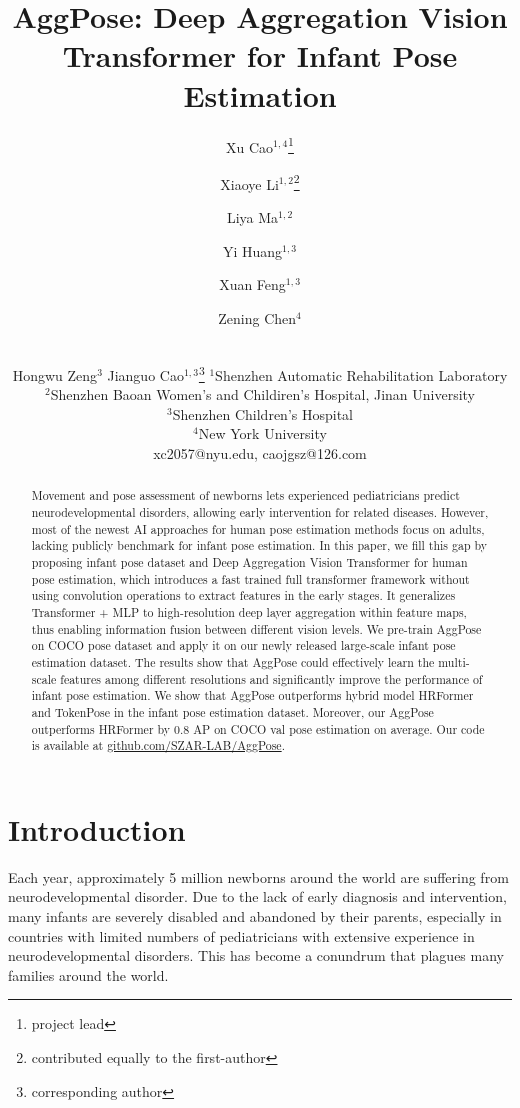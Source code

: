 \documentclass{article}
\title{AggPose: Deep Aggregation Vision Transformer for Infant Pose Estimation}
\author{
Xu Cao$^{1,4}$\thanks{project lead}
\and
Xiaoye Li$^{1,2}$\thanks{contributed equally to the first-author} \and
Liya Ma$^{1,2}$ \and
Yi Huang$^{1,3}$ \and
Xuan Feng$^{1,3}$ \and
Zening Chen$^{4}$ \and \\
Hongwu Zeng$^{3}$ \And
Jianguo Cao$^{1,3}$\thanks{corresponding author}
\affiliations
$^1$Shenzhen Automatic Rehabilitation Laboratory \\
$^2$Shenzhen Baoan Women's and Childiren's Hospital, Jinan University \\
$^3$Shenzhen Children’s Hospital \\
$^4$New York University \\
\emails
xc2057@nyu.edu, caojgsz@126.com
}
\begin{document}
\maketitle

\begin{abstract}
 Movement and pose assessment of newborns lets experienced pediatricians predict neurodevelopmental disorders, allowing early intervention for related diseases. However, most of the newest AI approaches for human pose estimation methods focus on adults, lacking publicly benchmark for infant pose estimation. In this paper, we fill this gap by proposing infant pose dataset and Deep Aggregation Vision Transformer for human pose estimation, which introduces a fast trained full transformer framework without using convolution operations to extract features in the early stages. It generalizes Transformer + MLP to high-resolution deep layer aggregation within feature maps, thus enabling information fusion between different vision levels. We pre-train AggPose on COCO pose dataset and apply it on our newly released large-scale infant pose estimation dataset. The results show that AggPose could effectively learn the multi-scale features among different resolutions and significantly improve the performance of infant pose estimation. We show that AggPose outperforms hybrid model HRFormer and TokenPose in the infant pose estimation dataset. Moreover, our AggPose outperforms HRFormer by 0.8 AP on COCO val pose estimation on average.  Our code is available at \href{https://github.com/SZAR-LAB/AggPose}{github.com/SZAR-LAB/AggPose}.
\end{abstract}





\section{Introduction}

Each year, approximately 5 million newborns around the world are suffering from neurodevelopmental disorder. Due to the lack of early diagnosis and intervention, many infants are severely disabled and abandoned by their parents, especially in countries with limited numbers of pediatricians with extensive experience in neurodevelopmental disorders. This has become a conundrum that plagues many families around the world. 
\end{document}
